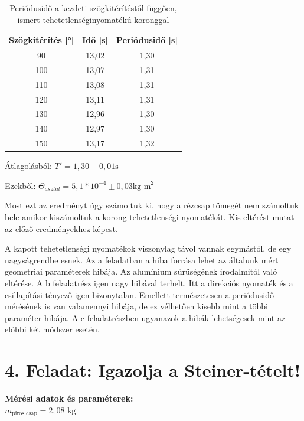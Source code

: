 \documentclass{article}
\begin{document}
\begin{table}[H]
    \centering
    \begin{tabular}{|c|c|c|}
        \hline
        Szögkitérítés [°] & Idő [s] & Periódusidő [s] \\ \hline
        90 & 13,02 & 1,30\\ \hline 
        100 & 13,07 & 1,31\\ \hline
        110 & 13,08 & 1,31\\ \hline 
        120 & 13,11 & 1,31\\ \hline
        130 & 12,96 & 1,30\\ \hline 
        140 & 12,97 & 1,30\\ \hline
        150 & 13,17 & 1,32\\ \hline
        
    \end{tabular}
    \caption{Periódusidő a kezdeti szögkitérítéstől függően, ismert tehetetlenséginyomatékú koronggal}
    \label{tab:periodusido}
\end{table}

Átlagolásból: $T' = 1,30 \pm 0,01 \text{s}$

Ezekből: $\Theta_{asztal} = 5,1*10^{-4} \pm 0,03 \text{kg m}^2$

Most ezt az eredményt úgy számoltuk ki, hogy a rézcsap tömegét nem számoltuk bele amikor kiszámoltuk a korong tehetetlenségi nyomatékát.
Kis eltérést mutat az előző eredményekhez képest.

A kapott tehetetlenségi nyomatékok viszonylag távol vannak egymástól, de egy nagyságrendbe esnek. Az a feladatban a hiba forrása lehet az általunk mért geometriai paraméterek hibája. Az alumínium sűrűségének irodalmitól való eltérése. A b feladatrész igen nagy hibával terhelt. Itt a direkciós nyomaték és a csillapítási tényező igen bizonytalan. Emellett természetesen a periódusidő mérésének is van valamennyi hibája, de ez vélhetően kisebb mint a többi paraméter hibája. A c feladatrészben ugyanazok a hibák lehetségesek mint az előbbi két módszer esetén.

\newpage

\section*{4. Feladat: Igazolja a Steiner-tételt!}


\vspace{0.5em}
\noindent
\textbf{Mérési adatok és paraméterek:} \\
$m_{\text{piros csap}} = 2,08 \text{ kg}$ \\[1ex]
\end{document}
